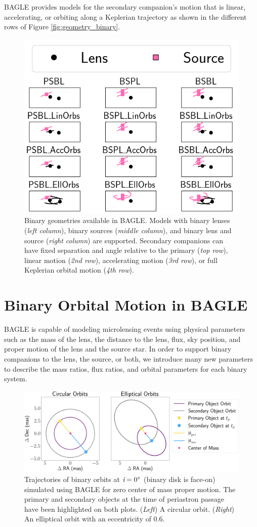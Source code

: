\documentclass[twocolumn]{aastex701}
\newcommand{\inclination}{\textit{i}}
\begin{document}
BAGLE provides models for the secondary companion's motion that is linear, accelerating, or orbiting along a Keplerian trajectory as shown in the different rows of Figure \ref{fig:geometry_binary}. 

\begin{figure}
    \centering
    \includegraphics[width= .5 \textwidth]{figures/geometry_schematic_binary_familes.png}
    \caption{Binary geometries available in BAGLE. Models with binary lenses ({\em left column}), binary sources ({\em middle column}), and binary lens and source ({\em right column}) are supported. Secondary companions can have fixed separation and angle relative to the primary ({\em top row}), linear motion ({\em 2nd row}), accelerating motion ({\em 3rd row}), or full Keplerian orbital motion ({\em 4th row}).}
    \label{fig:lens_source_models}
\end{figure}



\section{Binary Orbital Motion in BAGLE \label{sec:binary_solutions}}

BAGLE is capable of modeling microlensing events using physical parameters such as the mass of the lens, the distance to the lens, flux, sky position, and proper motion of the lens and the source star. In order to support binary companions to the lens, the source, or both, we introduce many new parameters to describe the mass ratios, flux ratios, and orbital parameters for each binary system. 

\begin{figure}
    \centering
    \includegraphics[width=\textwidth]{figures/com_motion.png}
    \caption{Trajectories of binary orbits at $\inclination = 0 \degree$ (binary disk is face-on) simulated using BAGLE for zero center of mass proper motion. The primary and secondary objects at the time of periastron passage have been highlighted on both plots. (\emph{Left}) A circular orbit. (\emph{Right}) An elliptical orbit with an eccentricity of $0.6$. }
    \label{fig:com_geometry}
\end{figure}
\end{document}
